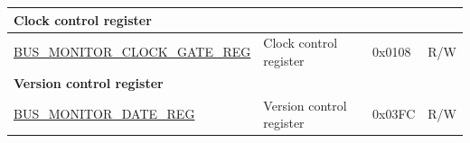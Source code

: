 \begin{longtable}{ |p{9.5cm} | p{11.6cm}| l | l | }
\multicolumn{4}{|l|}{\textbf{Clock control register}} \\ \hline
\hyperref[regdesc:BUSMONITORCLOCKGATEREG]{BUS\_MONITOR\_CLOCK\_GATE\_REG} & Clock control register & 0x0108 & R/W \\ \hline
\multicolumn{4}{|l|}{\textbf{Version control register}} \\ \hline
\hyperref[regdesc:BUSMONITORDATEREG]{BUS\_MONITOR\_DATE\_REG} & Version control register & 0x03FC & R/W \\ \hline
\end{longtable}
